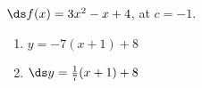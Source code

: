{$\ds f(x) = 3x^2-x+4$, at $c=-1$.
}
{\begin{enumerate}
\item		$y = -7(x+1)+8$
\item		$\ds y = \frac{1}{7}(x+1)+8$
\end{enumerate}
}
